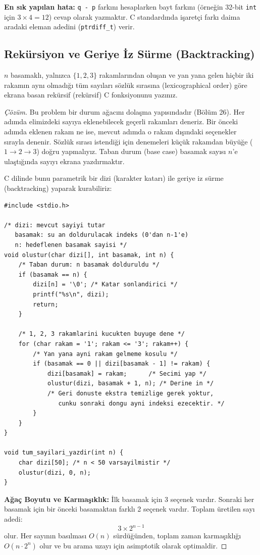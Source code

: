 \textbf{En sık yapılan hata:} \texttt{q - p} farkını hesaplarken bayt farkını (örneğin 32-bit \texttt{int} için $3 \times 4 = 12$) cevap olarak yazmaktır. C standardında işaretçi farkı daima aradaki eleman adedini (\texttt{ptrdiff\_t}) verir.

\subsection{Rekürsiyon ve Geriye İz Sürme (Backtracking)}

\begin{example}
$n$ basamaklı, yalnızca $\{1, 2, 3\}$ rakamlarından oluşan ve yan yana gelen hiçbir iki rakamın aynı olmadığı tüm sayıları sözlük sırasına (lexicographical order) göre ekrana basan rekürsif (rekürsif) C fonksiyonunu yazınız.
\end{example}

\begin{proof}[Çözüm]
Bu problem bir durum ağacını dolaşma yapısındadır (Bölüm 26). Her adımda elimizdeki sayıya eklenebilecek geçerli rakamları deneriz. Bir önceki adımda eklenen rakam ne ise, mevcut adımda o rakam dışındaki seçenekler sırayla denenir. Sözlük sırası istendiği için denemeleri küçük rakamdan büyüğe ($1 \to 2 \to 3$) doğru yapmalıyız. Taban durum (base case) basamak sayısı $n$'e ulaştığında sayıyı ekrana yazdırmaktır.

C dilinde bunu parametrik bir dizi (karakter katarı) ile geriye iz sürme (backtracking) yaparak kurabiliriz:

\begin{lstlisting}[language=CTemel]
#include <stdio.h>

/* dizi: mevcut sayiyi tutar
   basamak: su an doldurulacak indeks (0'dan n-1'e)
   n: hedeflenen basamak sayisi */
void olustur(char dizi[], int basamak, int n) {
    /* Taban durum: n basamak dolduruldu */
    if (basamak == n) {
        dizi[n] = '\0'; /* Katar sonlandirici */
        printf("%s\n", dizi);
        return;
    }
    
    /* 1, 2, 3 rakamlarini kucukten buyuge dene */
    for (char rakam = '1'; rakam <= '3'; rakam++) {
        /* Yan yana ayni rakam gelmeme kosulu */
        if (basamak == 0 || dizi[basamak - 1] != rakam) {
            dizi[basamak] = rakam;      /* Secimi yap */
            olustur(dizi, basamak + 1, n); /* Derine in */
            /* Geri donuste ekstra temizlige gerek yoktur,
               cunku sonraki dongu ayni indeksi ezecektir. */
        }
    }
}

void tum_sayilari_yazdir(int n) {
    char dizi[50]; /* n < 50 varsayilmistir */
    olustur(dizi, 0, n);
}
\end{lstlisting}

\textbf{Ağaç Boyutu ve Karmaşıklık:}
İlk basamak için 3 seçenek vardır. Sonraki her basamak için bir önceki basamaktan farklı 2 seçenek vardır. Toplam üretilen sayı adedi:
\[
3 \times 2^{n-1}
\]
olur. Her sayının basılması $O(n)$ sürdüğünden, toplam zaman karmaşıklığı $O(n \cdot 2^n)$ olur ve bu arama uzayı için asimptotik olarak optimaldir.
\end{proof}

